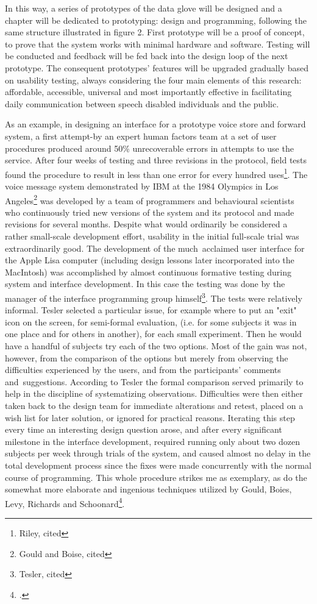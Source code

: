 In this way, a series of prototypes of the data glove will be designed and a chapter will be dedicated to prototyping: design and programming, following the same structure illustrated in figure 2. First prototype will be a proof of concept, to prove that the system works with minimal hardware and software. Testing will be conducted and feedback will be fed back into the design loop of the next prototype. The consequent prototypes’ features will be upgraded gradually based on usability testing, always considering the four main elements of this research: affordable, accessible, universal and most importantly effective in facilitating daily communication between speech disabled individuals and the public. 

As an example, in designing an interface for a prototype voice store and forward system, a first attempt-by an expert human factors team at a set of user procedures produced around 50\% unrecoverable errors in attempts to use the service. After four weeks of testing and three revisions in the protocol, field tests found the procedure to result in less than one error for every hundred uses\footnote{Riley, cited\cite{Cox2008}}. The voice message system demonstrated by IBM at the 1984 Olympics in Los Angeles\footnote{Gould and Boise, cited\cite{Cox2008}} was developed by a team of programmers and behavioural scientists who continuously tried new versions of the system and its protocol and made revisions for several months. Despite what would ordinarily be considered a rather small-scale development effort, usability in the initial full-scale trial was extraordinarily good. The development of the much acclaimed user interface for the Apple Lisa computer (including design lessons later incorporated into the MacIntosh) was accomplished by almost continuous formative testing during system and interface development. In this case the testing was done by the manager of the interface programming group himself\footnote{Tesler, cited\cite{Cox2008}}. The tests were relatively informal. Tesler selected a particular issue, for example where to put an "exit" icon on the screen, for semi-formal evaluation, (i.e. for some subjects it was in one place and for others in another), for each small experiment. Then he would have a handful of subjects try each of the two options. Most of the gain was not, however, from the comparison of the options but merely from observing the difficulties experienced by the users, and from the participants' comments and suggestions. According to Tesler the formal comparison served primarily to help in the discipline of systematizing observations. Difficulties were then either taken back to the design team for immediate alterations and retest, placed on a wish list for later solution, or ignored for practical reasons. Iterating this step every time an interesting design question arose, and after every significant milestone in the interface development, required running only about two dozen subjects per week through trials of the system, and caused almost no delay in the total development process since the fixes were made concurrently with the normal course of programming. This whole procedure strikes me as exemplary, as do the somewhat more elaborate and ingenious techniques utilized by Gould, Boies, Levy, Richards and Schoonard\footcite{Cox2008}.

